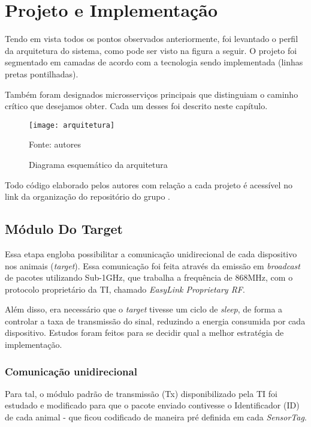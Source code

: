 \chapter{Projeto e Implementação}

Tendo em vista todos os pontos observados anteriormente, foi levantado o perfil da arquitetura do sistema, como pode ser visto na figura a seguir. O projeto foi segmentado em camadas de acordo com a tecnologia sendo implementada (linhas pretas pontilhadas).

Também foram designados microsserviços principais que distinguiam o caminho crítico que desejamos obter. Cada um desses foi descrito neste capítulo.

\begin{figure}[ht]
  \centering
    \caption{Diagrama esquemático da arquitetura}
    \texttt{[image: arquitetura]}
  \centerline{\small{Fonte: autores}}
\end{figure}
\FloatBarrier

Todo código elaborado pelos autores com relação a cada projeto é acessível no link da organização do repositório do grupo \cite{github}.

\section{Módulo Do Target}

Essa etapa engloba possibilitar a comunicação unidirecional de cada dispositivo nos animais (\emph{target}). Essa comunicação foi feita através da emissão em \emph{broadcast} de pacotes utilizando Sub-1GHz, que trabalha a frequência de 868MHz, com o protocolo proprietário da TI, chamado \emph{EasyLink Proprietary RF}.

Além disso, era necessário que o \emph{target} tivesse um ciclo de \emph{sleep}, de forma a controlar a taxa de transmissão do sinal, reduzindo a energia consumida por cada dispositivo. Estudos foram feitos para se decidir qual a melhor estratégia de implementação.

\subsection{Comunicação unidirecional}

Para tal, o módulo padrão de transmissão (Tx) disponibilizado pela TI foi estudado e modificado para que o pacote enviado contivesse o Identificador (ID) de cada animal - que ficou codificado de maneira pré definida em cada \emph{SensorTag}.

